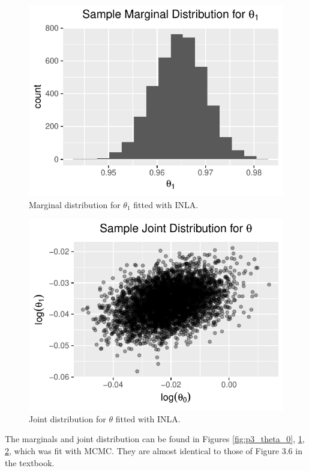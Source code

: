 \documentclass[letterpaper,11pt]{article}
\begin{document}
\begin{enumerate}
\begin{enumerate}
\begin{description}
      \begin{figure}
        \centering
        \includegraphics{p3_theta_1.pdf}
        \caption{Marginal distribution for $\theta_1$ fitted with INLA.}
        \label{fig:p3_theta_1}
      \end{figure}

      \begin{figure}
        \centering
        \includegraphics{p3_theta_joint.pdf}
        \caption{Joint distribution for $\theta$ fitted with INLA.}
        \label{fig:p3_theta_joint}
      \end{figure}

      The marginals and joint distribution can be found in Figures
      \ref{fig:p3_theta_0}, \ref{fig:p3_theta_1}, \ref{fig:p3_theta_joint},
      which was fit with MCMC. They are almost identical to those of Figure 3.6
      in the textbook.



\end{description}
\end{enumerate}
\end{enumerate}
\end{document}
